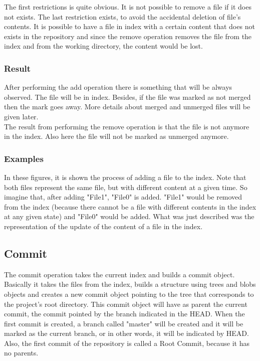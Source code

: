 The first restrictions is quite obvious. It is not possible to remove
a file if it does not exists. The last restriction exists, to avoid
the accidental deletion of file's contents. It is possible to have a
file in index with a certain content that does not exists in the
repository and since the remove operation removes the file from the index
and from the working directory, the content would be lost.  

\subsubsection{Result}
After performing the add operation there is something that will be
always observed. The file will be in index. Besides, if the file was
marked as not merged then the mark goes away. More details about
merged and unmerged files will be given later.\\

The result from performing the remove operation is that the file is
not anymore in the index. Also here the file will not be marked as
unmerged anymore.

\subsubsection{Examples}
In these figures, it is shown the process of adding a file to the index. Note
that both files represent the same file, but with different content at
a given time. So imagine that, after adding "File1", "File0" is added. "File1"
would be removed from the index (because there cannot be a file with different
contents in the index at any given state) and "File0" would be added. What was
just described was the representation of the update of the content of a file in the
index. \par

\subsection{Commit}
The commit operation takes the current index and builds a commit
object. Basically it takes the files from the index, builds a
structure using trees and blobs objects and creates a new commit
object pointing to the tree that corresponds to the project's root
directory. This commit object will have as parent the current commit,
the commit pointed by the branch indicated in the HEAD.
When the first commit is created, a branch called "master" will be created
and it will be marked as the current branch, or in other words, it
will be indicated by HEAD. Also, the first commit of the repository
is called a Root Commit, because it has no parents.

